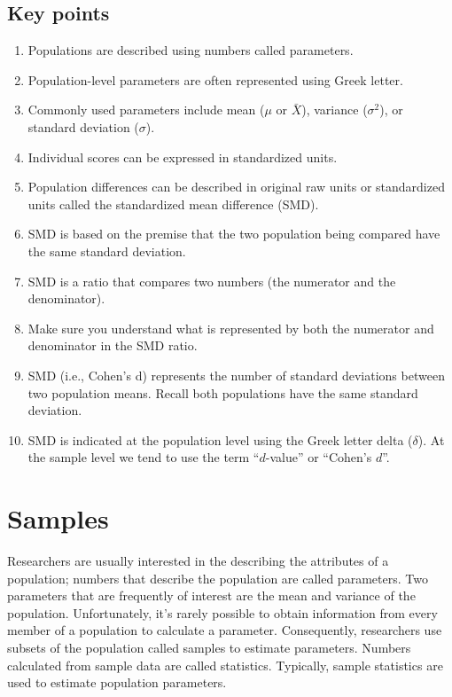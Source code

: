 \documentclass[
]{krantz}
\begin{document}
\hypertarget{key-points}{%
\section{Key points}\label{key-points}}

\begin{enumerate}
\def\labelenumi{\arabic{enumi}.}
\item
  Populations are described using numbers called parameters.
\item
  Population-level parameters are often represented using Greek letter.
\item
  Commonly used parameters include mean (\(\mu\) or \(\bar{X}\)), variance (\(\sigma^2\)), or standard deviation (\(\sigma\)).
\item
  Individual scores can be expressed in standardized units.
\item
  Population differences can be described in original raw units or standardized units called the standardized mean difference (SMD).
\item
  SMD is based on the premise that the two population being compared have the same standard deviation.
\item
  SMD is a ratio that compares two numbers (the numerator and the denominator).
\item
  Make sure you understand what is represented by both the numerator and denominator in the SMD ratio.
\item
  SMD (i.e., Cohen's d) represents the number of standard deviations between two population means. Recall both populations have the same standard deviation.
\item
  SMD is indicated at the population level using the Greek letter delta (\(\delta\)). At the sample level we tend to use the term ``\(d\)-value'' or ``Cohen's \(d\)''.
\end{enumerate}

\hypertarget{samples}{%
\chapter{Samples}\label{samples}}

Researchers are usually interested in the describing the attributes of a population; numbers that describe the population are called parameters. Two parameters that are frequently of interest are the mean and variance of the population. Unfortunately, it's rarely possible to obtain information from every member of a population to calculate a parameter. Consequently, researchers use subsets of the population called samples to estimate parameters. Numbers calculated from sample data are called statistics. Typically, sample statistics are used to estimate population parameters.
\end{document}

